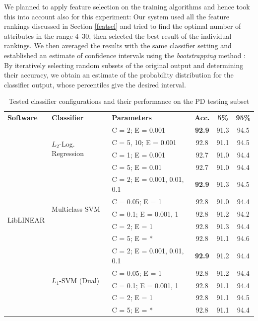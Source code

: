 \documentclass[12pt,notitlepage]{report}
\begin{document}
We planned to apply feature selection on the training algorithms and hence took this into account also for this experiment: Our system used all the feature rankings discussed in Section \ref{featsel} and tried to find the optimal number of attributes in the range 4--30, then selected the best result of the individual rankings. We then averaged the results with the same classifier setting and established an estimate of confidence intervals using the \emph{bootstrapping} method \citep{efron79}: By iteratively selecting random subsets of the original output and determining their accuracy, we obtain an estimate of the probability distribution for the classifier output, whose percentiles give the desired interval. %

\begin{table}[htbp]
\caption{Tested classifier configurations and their performance on the PD testing subset}\label{tab:pd-classifiers}\footnotesize
\begin{center}
\begin{tabular}{|l|l|l|c|c|c|}\hline
\bf Software & \bf Classifier & \bf Parameters & \bf Acc. & \bf 5\% & \bf 95\% \\\cline{2-6}
\multirow{24}{*}{LibLINEAR} & \multirow{4}{*}{$L_2$-Log. Regression} & C = 2; E = 0.001 & \bf 92.9 & 91.3 & 94.5 \\
 & & C = 5, 10; E = 0.001 & 92.8 & 91.1 & 94.5 \\
 & & C = 1; E = 0.001 & 92.7 & 91.0 & 94.4 \\
 & & C = 5; E = 0.01 & 92.7 & 91.0 & 94.4 \\\cline{2-6}
 & \multirow{5}{*}{Multiclass SVM} & C = 2; E = 0.001, 0.01, 0.1 & \bf 92.9 & 91.3 & 94.5 \\ 
 &  & C = 0.05; E = 1 & 92.8 & 91.0 & 94.4 \\
 &  & C = 0.1; E = 0.001, 1 & 92.8 & 91.2 & 94.2 \\
 &  & C = 2; E = 1 & 92.8 & 91.3 & 94.4 \\
 & & C = 5; E = * & 92.8 & 91.1 & 94.6 \\\cline{2-6}
 & \multirow{5}{*}{$L_1$-SVM (Dual)} & C = 2; E = 0.001, 0.01, 0.1 & \bf 92.9 & 91.2 & 94.4 \\
 & & C = 0.05; E = 1 & 92.8 & 91.2 & 94.4 \\
 &  & C = 0.1; E = 0.001, 1 & 92.8 & 91.1 & 94.4 \\
 & & C = 2; E = 1 & 92.8 & 91.1 & 94.5 \\
 & & C = 5; E = * & 92.8 & 91.1 & 94.4 \\\cline{2-6}

\end{tabular}
\end{center}
\end{table}
\end{document}
